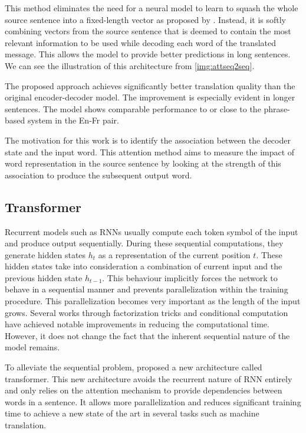 This method eliminates the need for a neural model to learn to squash the whole source sentence into a fixed-length vector as proposed by . Instead, it is softly combining vectors from the source sentence that is deemed to contain the most relevant information to be used while decoding each word of the translated message. This allows the model to provide better predictions in long sentences. We can see the illustration of this architecture from \cref{img:attseq2seq}.

The proposed approach achieves significantly better translation quality than the original encoder-decoder model. The improvement is especially evident in longer sentences. The model shows comparable performance to or close to the phrase-based system in the En-Fr pair.

The motivation for this work is to identify the association between the decoder state and the input word. This attention method aims to measure the impact of word representation in the source sentence by looking at the strength of this association to produce the subsequent output word.

\subsection{Transformer}
\label{ssec:transformer}
Recurrent models such as RNNs usually compute each token symbol of the input and produce output sequentially. During these sequential computations, they generate hidden states $h_t$ as a representation of the current position $t$. These hidden states take into consideration a combination of current input and the previous hidden state $h_{t-1}$. This behaviour implicitly forces the network to behave in a sequential manner and prevents parallelization within the training procedure. This parallelization becomes very important as the length of the input grows. Several works through factorization tricks  and conditional computation  have achieved notable improvements in reducing the computational time. However, it does not change the fact that the inherent sequential nature of the model remains.

To alleviate the sequential problem,  proposed a new architecture called transformer. This new architecture avoids the recurrent nature of RNN entirely and only relies on the attention mechanism to provide dependencies between words in a sentence. It allows more parallelization and reduces significant training time to achieve a new state of the art in several tasks such as machine translation.

